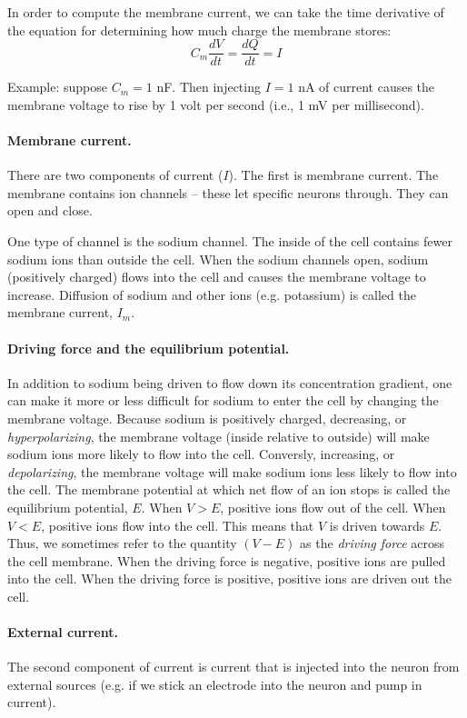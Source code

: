\documentclass[12pt]{article}
\begin{document}
In order to compute the membrane current, we can take the time derivative of the equation for determining how much charge the membrane stores:
\[
C_m \frac{dV}{dt} = \frac{dQ}{dt} = I
\]

Example: suppose $C_m = 1$ nF.  Then injecting $I = 1$ nA of current causes the membrane voltage to rise by 1 volt per second (i.e., 1 mV per millisecond).

\paragraph{Membrane current.}  There are two components of current ($I$).  The first is membrane current.  The membrane contains ion channels -- these let specific neurons through.  They can open and close.

One type of channel is the sodium channel.  The inside of the cell contains fewer sodium ions than outside the cell.  When the sodium channels open, sodium (positively charged) flows into the cell and causes the membrane voltage to increase.  Diffusion of sodium and other ions (e.g. potassium) is called the membrane current, $I_{m}$.

\paragraph{Driving force and the equilibrium potential.}  In addition
to sodium being driven to flow down its concentration gradient, one
can make it more or less difficult for sodium to enter the cell by
changing the membrane voltage.  Because sodium is positively charged,
decreasing, or \textit{hyperpolarizing}, the membrane voltage (inside
relative to outside) will make sodium ions more likely to flow into
the cell.  Conversly, increasing, or \textit{depolarizing}, the
membrane voltage will make sodium ions less likely to flow into the
cell.  The membrane potential at which net flow of an ion stops is
called the equilibrium potential, $E$.  When $V > E$, positive ions
flow out of the cell.  When $V < E$, positive ions flow into the cell.
This means that $V$ is driven towards $E$.  Thus, we sometimes refer
to the quantity $(V - E)$ as the \textit{driving force} across the
cell membrane.  When the driving force is negative, positive ions are
pulled into the cell.  When the driving force is positive, positive
ions are driven out the cell.

\paragraph{External current.}  The second component of current is current that is injected into the neuron from external sources (e.g. if we stick an electrode into the neuron and pump in current).  
\end{document}
